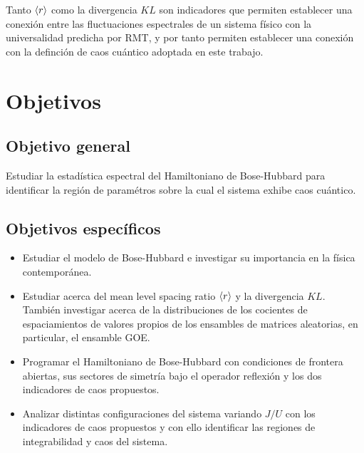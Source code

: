 \documentclass[spanish,titlepage,table]{practicas}
\begin{document}
Tanto $\ev{r}$ como la divergencia $KL$ son indicadores que permiten establecer una conexión entre las fluctuaciones espectrales de un sistema físico 
con la universalidad predicha por RMT, y por tanto permiten establecer una conexión con la definción de caos cuántico adoptada en este trabajo.


\section{Objetivos}\label{sec:objetivos}
\subsection{Objetivo general}
  Estudiar la estadística espectral del Hamiltoniano de Bose-Hubbard para identificar la región de paramétros sobre la cual 
 el sistema exhibe caos cuántico.
 \subsection{Objetivos específicos}
  \begin{itemize}
    \item Estudiar el modelo de Bose-Hubbard e investigar su importancia en la física contemporánea.
    \item Estudiar acerca del mean level spacing ratio $\ev{r}$ y la divergencia $KL$. También investigar acerca de la distribuciones de los cocientes de   espaciamientos de valores propios de los ensambles de matrices aleatorias, en particular, el ensamble GOE.
    \item Programar el Hamiltoniano de Bose-Hubbard con condiciones de frontera abiertas, sus sectores de simetría bajo el operador reflexión y los dos indicadores de caos propuestos.
    \item Analizar distintas configuraciones del sistema variando $J/U$ con los indicadores de caos propuestos y con ello identificar las regiones de integrabilidad y caos del sistema.
 \end{itemize}
 
\end{document}
